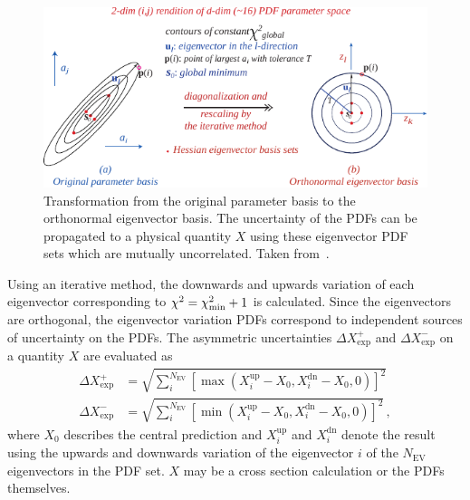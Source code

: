 \begin{figure}[htb]
  \centering
  \includegraphics[width=1.0\textwidth]{figures/pdf_constraints/hessianmethod.pdf}
  \caption[Transformation of the parameter basis to the eigenvector basis]
    {Transformation from the original parameter basis to the orthonormal
    eigenvector basis. The uncertainty of the PDFs can be propagated to a
    physical quantity $X$ using these eigenvector PDF sets which are mutually
    uncorrelated. Taken from~\cite{Pumplin:2001ct}.}
    \label{fig:eigenvector_basis_set}
\end{figure}

Using an iterative method, the downwards and upwards variation of each
eigenvector corresponding to $\chi^2 = \chi^2_{\mathrm{min}} + 1$ is calculated.
Since the eigenvectors are orthogonal, the eigenvector variation PDFs correspond
to independent sources of uncertainty on the PDFs. The asymmetric uncertainties
$\Delta X_{\mathrm{exp}}^+$ and $\Delta X_{\mathrm{exp}}^-$ on a quantity $X$ are evaluated as
%
\begin{align*}
  \Delta X^+_{\mathrm{exp}} &= \sqrt{\sum_i^{N_{\mathrm{EV}}} \left[ \max(X_i^{\mathrm{up}}
    -X_0, X_i^{\mathrm{dn}} - X_0, 0)\right]^2}\\
    \Delta X^-_{\mathrm{exp}} &= \sqrt{\sum_i^{N_{\mathrm{EV}}} \left[
    \min(X_i^{\mathrm{up}} - X_0, X_i^{\mathrm{dn}} - X_0,0)\right]^2}\,,
\end{align*}
%
where $X_0$ describes the central prediction and $X_i^{\mathrm{up}}$ and
$X_i^{\mathrm{dn}}$ denote the result using the upwards and downwards variation of
the eigenvector $i$ of the $N_{\mathrm{EV}}$ eigenvectors in the PDF
set. $X$ may be a cross section calculation or the PDFs themselves.

